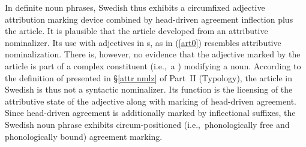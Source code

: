 In definite noun phrases, Swedish thus exhibits a circumfixed adjective attribution marking device combined by head\hyp{}driven agreement inflection plus the article. It is plausible that the article developed from an attributive nominalizer. Its use with adjectives in s, as in (\ref{art0}) resembles attributive nominalization. There is, however, no evidence that the adjective marked by the article is part of a complex constituent (i.e.,~a ) modifying a noun. According to the definition of  presented in \S\ref{attr nmlz} of Part~II (Typology), the article in Swedish is thus not a syntactic nominalizer. Its function is the licensing of the attributive state of the adjective along with marking of head\hyp{}driven agreement. Since head\hyp{}driven agreement is additionally marked by inflectional suffixes, the Swedish noun phrase exhibits circum-positioned (i.e.,~phonologically free and phonologically bound) agreement marking.

